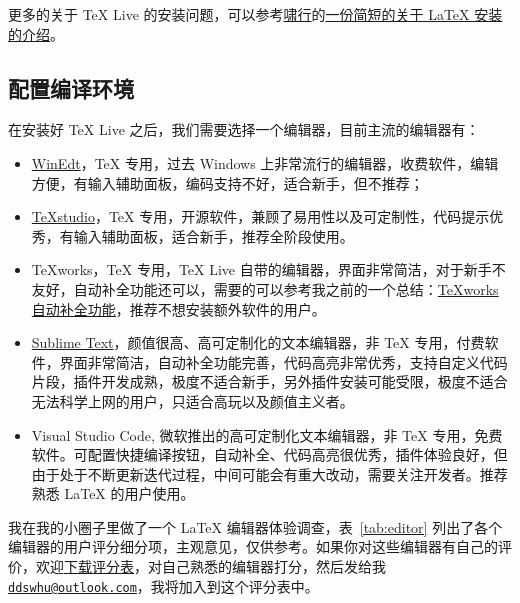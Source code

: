 \documentclass[11pt,a4paper]{dlove}
\newcommand\email[1]{\href{mailto:#1}{\nolinkurl{#1}}}
\begin{document}
更多的关于 \TeX{} Live 的安装问题，可以参考\href{https://github.com/OsbertWang}{啸行}的\href{https://github.com/OsbertWang/install-latex}{一份简短的关于 \LaTeX{} 安装的介绍}。

\subsection{配置编译环境}
在安装好 \TeX{} Live 之后，我们需要选择一个编辑器，目前主流的编辑器有：
\begin{itemize}
\item \href{http://www.winedt.com/}{WinEdt}，\TeX{} 专用，过去 Windows 上非常流行的编辑器，收费软件，编辑方便，有输入辅助面板，编码支持不好，适合新手，但不推荐；
\item \href{http://texstudio.sourceforge.net/}{\TeX{}studio}，\TeX{} 专用，开源软件，兼顾了易用性以及可定制性，代码提示优秀，有输入辅助面板，适合新手，推荐全阶段使用。
\item \TeX{}works，\TeX{} 专用，\TeX{} Live 自带的编辑器，界面非常简洁，对于新手不友好，自动补全功能还可以，需要的可以参考我之前的一个总结：\href{https://github.com/EthanDeng/texworks-autocomplete}{\TeX{}works 自动补全功能}，推荐不想安装额外软件的用户。
\item \href{http://www.sublimetext.com/}{Sublime Text}，颜值很高、高可定制化的文本编辑器，非 \TeX{} 专用，付费软件，界面非常简洁，自动补全功能完善，代码高亮非常优秀，支持自定义代码片段，插件开发成熟，极度不适合新手，另外插件安装可能受限，极度不适合无法科学上网的用户，只适合高玩以及颜值主义者。
\item Visual Studio Code, 微软推出的高可定制化文本编辑器，非 \TeX{} 专用，免费软件。可配置快捷编译按钮，自动补全、代码高亮很优秀，插件体验良好，但由于处于不断更新迭代过程，中间可能会有重大改动，需要关注开发者。推荐熟悉 \LaTeX{} 的用户使用。
\end{itemize}

我在我的小圈子里做了一个 \LaTeX{} 编辑器体验调查，表~\ref{tab:editor} 列出了各个编辑器的用户评分细分项，主观意见，仅供参考。如果你对这些编辑器有自己的评价，欢迎\href{https://github.com/EthanDeng/mhlatex4econ/blob/master/archive/LaTeX 编辑器对比评分表.xlsx}{下载评分表}，对自己熟悉的编辑器打分，然后发给我 \email{ddswhu@outlook.com}，我将加入到这个评分表中。
\end{document}
